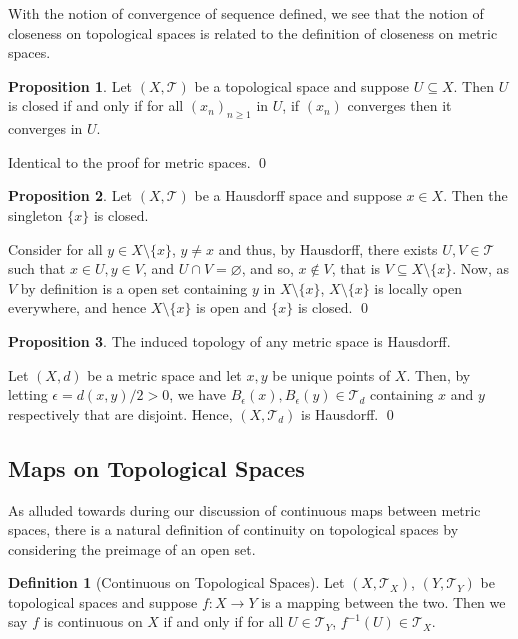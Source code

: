 \documentclass[
]{article}
\theoremstyle{definition}
\newtheorem{prop}{Proposition}
\theoremstyle{definition}
\newtheorem{definition}{Definition}[section]
\begin{document}
With the notion of convergence of sequence defined, we see that the
notion of closeness on topological spaces is related to the definition
of closeness on metric spaces.

\begin{prop}
  Let \((X, \mathcal{T})\) be a topological space and suppose \(U \subseteq X\). 
  Then \(U\) is closed if and only if for all \((x_n)_{n \ge 1}\) in \(U\), if 
  \((x_n)\) converges then it converges in \(U\).
\end{prop}
\proof

Identical to the proof for metric spaces. \qed

\begin{prop}
  Let \((X, \mathcal{T})\) be a Hausdorff space and suppose \(x \in X\). 
  Then the singleton \(\{x\}\) is closed.
\end{prop}
\proof

Consider for all \(y \in X \setminus \{x\}\), \(y \neq x\) and thus, by
Hausdorff, there exists \(U, V \in \mathcal{T}\) such that
\(x \in U, y \in V\), and \(U \cap V = \varnothing\), and so,
\(x \not\in V\), that is \(V \subseteq X \setminus \{x\}\). Now, as
\(V\) by definition is a open set containing \(y\) in
\(X \setminus \{x\}\), \(X \setminus \{x\}\) is locally open everywhere,
and hence \(X \setminus \{x\}\) is open and \(\{x\}\) is closed. \qed

\begin{prop}
  The induced topology of any metric space is Hausdorff.
\end{prop}
\proof

Let \((X, d)\) be a metric space and let \(x, y\) be unique points of
\(X\). Then, by letting \(\epsilon = d(x, y) / 2 > 0\), we have
\(B_\epsilon(x),  B_\epsilon(y) \in \mathcal{T}_d\) containing \(x\) and
\(y\) respectively that are disjoint. Hence, \((X, \mathcal{T}_d)\) is
Hausdorff. \qed

\hypertarget{maps-on-topological-spaces}{%
\subsection{Maps on Topological
Spaces}\label{maps-on-topological-spaces}}

As alluded towards during our discussion of continuous maps between
metric spaces, there is a natural definition of continuity on
topological spaces by considering the preimage of an open set.

\begin{definition}[Continuous on Topological Spaces]
  Let \((X, \mathcal{T}_X)\), \((Y, \mathcal{T}_Y)\) be topological spaces and 
  suppose \(f : X \to Y\) is a mapping between the two. Then we say \(f\) is 
  continuous on \(X\) if and only if for all \(U \in \mathcal{T}_Y\), 
  \(f^{-1}(U) \in \mathcal{T}_X\).
\end{definition}
\end{document}
